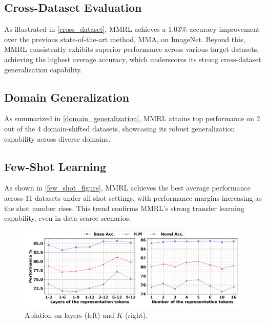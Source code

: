 \subsection{Cross-Dataset Evaluation}
As illustrated in \cref{cross_dataset}, MMRL achieves a 1.03\% accuracy improvement over the previous state-of-the-art method, MMA, on ImageNet. Beyond this, MMRL consistently exhibits superior performance across various target datasets, achieving the highest average accuracy, which underscores its strong cross-dataset generalization capability.

\subsection{Domain Generalization}
As summarized in \cref{domain_generalization}, MMRL attains top performance on 2 out of the 4 domain-shifted datasets, showcasing its robust generalization capability across diverse domains.


\subsection{Few-Shot Learning}
As shown in \cref{few_shot_figure}, MMRL achieves the best average performance across 11 datasets under all shot settings, with performance margins increasing as the shot number rises. This trend confirms MMRL’s strong transfer learning capability, even in data-scarce scenarios.


\begin{figure}[tb]
\centering
\setlength{\abovecaptionskip}{0.15cm}   
  \includegraphics[width=1.0\linewidth]{fig/ablation_layer_N.png}
  \caption{Ablation on layers (left) and $K$ (right).}
  \label{ablation_layers_numbers}
\vspace{-0.5cm}
\end{figure}


